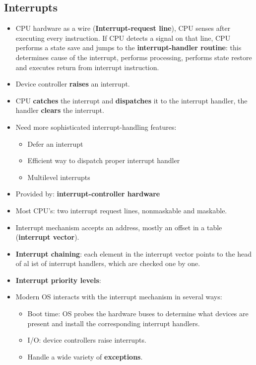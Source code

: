 \documentclass[10pt]{report}
\begin{document}
		\subsection{Interrupts}
			\begin{itemize}
				\item CPU hardware as a wire (\textbf{Interrupt-request line}), CPU senses after executing every instruction. If CPU detects a signal on that line, CPU performs a state save and jumps to the \textbf{interrupt-handler routine}: this determines cause of the interrupt, performs processing, performs state restore and executes return from interrupt instruction.
				\item Device controller \textbf{raises} an interrupt.
				\item CPU \textbf{catches} the interrupt and \textbf{dispatches} it to the interrupt handler, the handler \textbf{clears} the interrupt.
				\item Need more sophisticated interrupt-handling features:
				\begin{itemize}
					\item Defer an interrupt
					\item Efficient way to dispatch proper interrupt handler
					\item Multilevel interrupts
				\end{itemize}
				\item Provided by: \textbf{interrupt-controller hardware}
				\item Most CPU's: two interrupt request lines, nonmaskable and maskable.
				\item Interrupt mechanism accepts an address, mostly an offset in a table (\textbf{interrupt vector}).
				\item \textbf{Interrupt chaining}: each element in the interrupt vector points to the head of al ist of interrupt handlers, which are checked one by one.
				\item \textbf{Interrupt priority levels}:
				\item Modern OS interacts with the interrupt mechanism in several ways:
				\begin{itemize}
					\item Boot time: OS probes the hardware buses to determine what devices are present and install the corresponding interrupt handlers.
					\item I/O: device controllers raise interrupts.
					\item Handle a wide variety of \textbf{exceptions}.
				\end{itemize}

\end{itemize}
\end{document}
